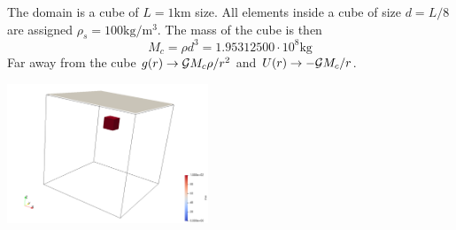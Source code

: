 The domain is a cube of $L=1\si{\km}$ size. All elements inside a cube of size $d=L/8$ are assigned
$\rho_s=100\si{\kg\per\cubic\metre}$.
The mass of the cube is then
\[
M_c = \rho d^3 = 1.95312500\cdot 10^8 \si{\kg}
\]
Far away from the cube $g(r) \rightarrow {\cal G}M_c \rho/r^2$ and $U(r) \rightarrow -{\cal G} M_c/r$.

\begin{center}
\includegraphics[width=6cm]{python_codes/fieldstone_84/cube/setup}
\end{center}


